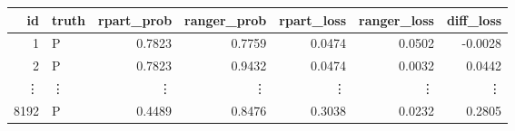 \begin{table}[ht]
\centering
\begin{tabular}{rlrrrrr}
  \hline
id & truth & rpart\_prob & ranger\_prob & rpart\_loss & ranger\_loss & diff\_loss \\
  \hline
    1 & P & 0.7823 & 0.7759 & 0.0474 & 0.0502 & -0.0028 \\
      2 & P & 0.7823 & 0.9432 & 0.0474 & 0.0032 & 0.0442 \\
      \vdots & \vdots & \vdots & \vdots & \vdots & \vdots & \vdots \\
   8192 & P & 0.4489 & 0.8476 & 0.3038 & 0.0232 & 0.2805 \\
   \hline
\end{tabular}
\end{table}
